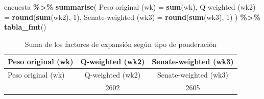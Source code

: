 \documentclass[
  spanish,
  12pt,
]{book}
\newenvironment{Shaded}{\begin{snugshade}}{\end{snugshade}}
\newcommand{\AttributeTok}[1]{\textcolor[rgb]{0.13,0.29,0.53}{#1}}
\newcommand{\DecValTok}[1]{\textcolor[rgb]{0.00,0.00,0.81}{#1}}
\newcommand{\FunctionTok}[1]{\textcolor[rgb]{0.13,0.29,0.53}{\textbf{#1}}}
\newcommand{\NormalTok}[1]{#1}
\newcommand{\OtherTok}[1]{\textcolor[rgb]{0.56,0.35,0.01}{#1}}
\newcommand{\SpecialCharTok}[1]{\textcolor[rgb]{0.81,0.36,0.00}{\textbf{#1}}}
\newcommand{\StringTok}[1]{\textcolor[rgb]{0.31,0.60,0.02}{#1}}
\begin{document}
\begin{Shaded}
\end{Shaded}

\begin{Shaded}
\begin{Highlighting}[]
\NormalTok{encuesta }\SpecialCharTok{\%\textgreater{}\%}
  \FunctionTok{summarise}\NormalTok{(}
    \StringTok{\textasciigrave{}}\AttributeTok{Peso original (wk)}\StringTok{\textasciigrave{}}     \OtherTok{=} \FunctionTok{sum}\NormalTok{(wk),}
    \StringTok{\textasciigrave{}}\AttributeTok{Q{-}weighted (wk2)}\StringTok{\textasciigrave{}}       \OtherTok{=} \FunctionTok{round}\NormalTok{(}\FunctionTok{sum}\NormalTok{(wk2), }\DecValTok{1}\NormalTok{),}
    \StringTok{\textasciigrave{}}\AttributeTok{Senate{-}weighted (wk3)}\StringTok{\textasciigrave{}}  \OtherTok{=} \FunctionTok{round}\NormalTok{(}\FunctionTok{sum}\NormalTok{(wk3), }\DecValTok{1}\NormalTok{)}
\NormalTok{  ) }\SpecialCharTok{\%\textgreater{}\%} \FunctionTok{tabla\_fmt}\NormalTok{()}
\end{Highlighting}
\end{Shaded}

\begin{longtable}[]{@{}lcc@{}}
\caption{\label{tab:tab-resumen-pesos}Suma de los factores de expansión según tipo de ponderación}\tabularnewline
\toprule\noalign{}
Peso original (wk) & Q-weighted (wk2) & Senate-weighted (wk3) \\
\midrule\noalign{}
\endfirsthead
\toprule\noalign{}
Peso original (wk) & Q-weighted (wk2) & Senate-weighted (wk3) \\
\midrule\noalign{}
\endhead
\bottomrule\noalign{}
\endlastfoot
150266 & 2602 & 2605 \\
\end{longtable}
\end{document}
